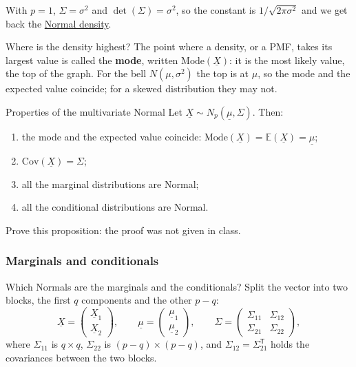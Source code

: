 \documentclass[a4paper,12pt,oneside]{report}
\begin{document}
With $p=1$, $\Sigma=\sigma^2$ and $\det(\Sigma)=\sigma^2$, so the constant
is $1/\sqrt{2\pi\sigma^2}$ and we get back the
\hyperref[def:normal]{Normal density}.

Where is the density highest? The point where a density, or a PMF, takes
its largest value is called the \textbf{mode}, written
$\mathrm{Mode}(\underline{X})$: it is the most likely value, the top of
the graph. For the bell $N(\mu,\sigma^2)$ the top is at $\mu$, so the mode
and the expected value coincide; for a skewed distribution they may not.

\begin{framedprop}{Properties of the multivariate Normal}\label{prop:mvn-properties}
Let $\underline{X}\sim N_p(\underline{\mu},\Sigma)$. Then:
\begin{enumerate}
\item the mode and the expected value coincide:
$\mathrm{Mode}(\underline{X})=\mathbb{E}(\underline{X})=\underline{\mu}$;
\item $\mathrm{Cov}(\underline{X})=\Sigma$;
\item all the marginal distributions are Normal;
\item all the conditional distributions are Normal.
\end{enumerate}
\end{framedprop}

\begin{todobox}
Prove this proposition: the proof was not given in class.
\end{todobox}

\subsubsection{Marginals and conditionals}\label{sec:mvn-marginals}

Which Normals are the marginals and the conditionals? Split the vector into
two blocks, the first $q$ components and the other $p-q$:
\[
\underline{X}=\begin{pmatrix}\underline{X}_1\\ \underline{X}_2\end{pmatrix},
\qquad
\underline{\mu}=\begin{pmatrix}\underline{\mu}_1\\ \underline{\mu}_2\end{pmatrix},
\qquad
\Sigma=\begin{pmatrix}\Sigma_{11}&\Sigma_{12}\\ \Sigma_{21}&\Sigma_{22}\end{pmatrix},
\]
where $\Sigma_{11}$ is $q\times q$, $\Sigma_{22}$ is
$(p-q)\times(p-q)$, and $\Sigma_{12}=\Sigma_{21}^{\mathsf T}$ holds the
covariances between the two blocks.
\end{document}
